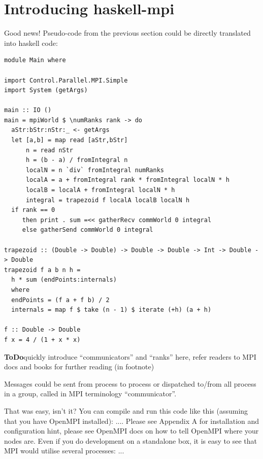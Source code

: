 \documentclass{tmr}
\newcommand{\ToDo}[1]{\textbf{ToDo}{#1}}
\begin{document}
\section{Introducing haskell-mpi}

Good news! Pseudo-code from the previous section could be directly translated into haskell code:

%

\begin{Verbatim}
module Main where

import Control.Parallel.MPI.Simple
import System (getArgs)

main :: IO ()
main = mpiWorld $ \numRanks rank -> do
  aStr:bStr:nStr:_ <- getArgs
  let [a,b] = map read [aStr,bStr]
      n = read nStr
      h = (b - a) / fromIntegral n
      localN = n `div` fromIntegral numRanks
      localA = a + fromIntegral rank * fromIntegral localN * h
      localB = localA + fromIntegral localN * h
      integral = trapezoid f localA localB localN h
  if rank == 0
     then print . sum =<< gatherRecv commWorld 0 integral
     else gatherSend commWorld 0 integral

trapezoid :: (Double -> Double) -> Double -> Double -> Int -> Double -> Double
trapezoid f a b n h =
  h * sum (endPoints:internals)
  where
  endPoints = (f a + f b) / 2
  internals = map f $ take (n - 1) $ iterate (+h) (a + h)

f :: Double -> Double
f x = 4 / (1 + x * x)
\end{Verbatim}

\ToDo quickly introduce ``communicators'' and ``ranks'' here, refer readers to MPI docs and books for further reading (in footnote)

Messages could be sent from process to process or
dispatched to/from all process in a group, called in MPI terminology ``communicator''.

That was easy, isn't it? You can compile and run this code like this (assuming that you have OpenMPI installed): .... Please see Appendix A for installation and configuration hint, please see OpenMPI docs on how to tell OpenMPI where your nodes are. Even if you do development on a standalone box, it is easy to see that MPI would utilise several processes: ...
\end{document}
